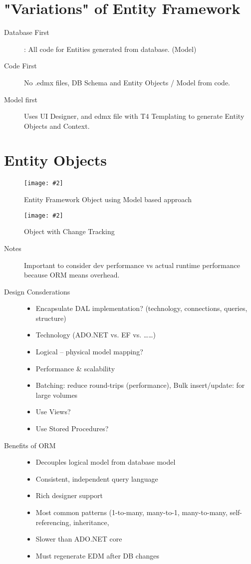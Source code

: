 \documentclass[a4paper,10pt]{scrreprt}
\newcommand{\pic}[2][figure]{\begin{figure}[h]
 \centering
 \texttt{[image: \#2]}
 \caption{#1}
\end{figure}
}
\begin{document}
\section{"Variations" of Entity Framework}
\begin{description}
\item[Database First] : All code for Entities generated from database. (Model)
\item[Code First] No .edmx files, DB Schema and Entity Objects / Model from code. 
\item [Model first] Uses UI Designer, and edmx file with T4 Templating to generate Entity Objects and Context.
\end{description}

\section{Entity Objects}
\pic[Entity Framework Object using Model based approach]{efo1.png}
\pic[Object with Change Tracking]{efoa2.png}
\begin{description}
\item[Notes] Important to consider dev performance vs actual runtime performance because ORM means overhead.
\item [Design Consderations] \begin{itemize}
\item Encapsulate DAL implementation? (technology, connections, queries, structure)
\item Technology (ADO.NET vs. EF vs. ……)
\item Logical – physical model mapping?
\item Performance \& scalability
\item Batching: reduce round-trips (performance), Bulk insert/update: for large volumes
\item Use Views?
\item Use Stored Procedures?
\end{itemize}
\item[Benefits of ORM] \begin{itemize}
\item Decouples logical model from database model
\item Consistent, independent query language
\item Rich designer support
\item Most common patterns (1-to-many, many-to-1, many-to-many, self-referencing, inheritance,
\item Slower than ADO.NET core
\item Must regenerate EDM after DB changes
\end{itemize}
\end{description}
\end{document}

